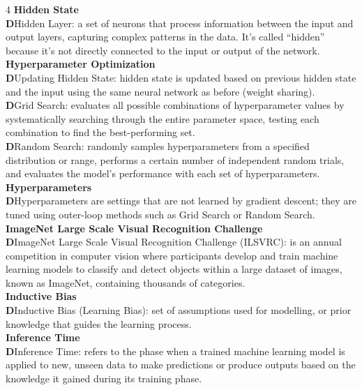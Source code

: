 \documentclass[8pt]{extarticle}
\newcommand{\dtag}{\textcolor{definitioncolor}{\tiny\textbf{D}}\;}
\begin{document}
\begin{multicols}{4}
\vspace{2pt}\textbf{Hidden State}\\
\dtag Hidden Layer: a set of neurons that process information between the input and output layers, capturing complex patterns in the data. It's called ``hidden'' because it's not directly connected to the input or output of the network.\\
\vspace{2pt}\textbf{Hyperparameter Optimization}\\
\dtag Updating Hidden State: hidden state is updated based on previous hidden state and the input using the same neural network as before (weight sharing).\\
\dtag Grid Search: evaluates all possible combinations of hyperparameter values by systematically searching through the entire parameter space, testing each combination to find the best-performing set.\\
\dtag Random Search: randomly samples hyperparameters from a specified distribution or range, performs a certain number of independent random trials, and evaluates the model's performance with each set of hyperparameters.\\
\vspace{2pt}\textbf{Hyperparameters}\\
\dtag Hyperparameters are settings that are not learned by gradient descent; they are tuned using outer-loop methods such as Grid Search or Random Search.\\
\vspace{2pt}\textbf{ImageNet Large Scale Visual Recognition Challenge}\\
\dtag ImageNet Large Scale Visual Recognition Challenge (ILSVRC): is an annual competition in computer vision where participants develop and train machine learning models to classify and detect objects within a large dataset of images, known as ImageNet, containing thousands of categories.\\
\vspace{2pt}\textbf{Inductive Bias}\\
\dtag Inductive Bias (Learning Bias): set of assumptions used for modelling, or prior knowledge that guides the learning process.\\
\vspace{2pt}\textbf{Inference Time}\\
\dtag Inference Time: refers to the phase when a trained machine learning model is applied to new, unseen data to make predictions or produce outputs based on the knowledge it gained during its training phase.\\

\end{multicols}
\end{document}
